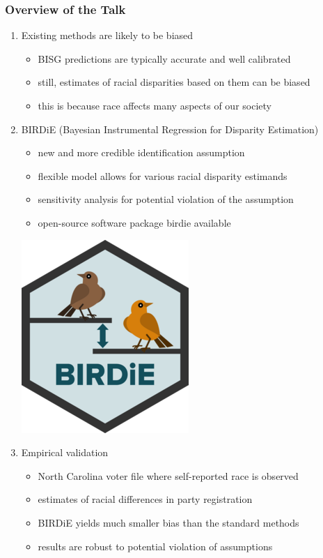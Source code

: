 \documentclass[handout]{beamer}
\begin{document}
\begin{frame}

  \frametitle{Overview of the Talk}

  \begin{enumerate}
  \item Existing methods are likely to be biased
    \begin{itemize}
    \item BISG predictions are typically accurate and well calibrated
    \item still, estimates of racial disparities based on them can be biased
    \item this is because race affects many aspects of our society
    \end{itemize}
    \bigskip
  \item \alert{BIRDiE} (Bayesian Instrumental Regression for Disparity
    Estimation) 
    \begin{itemize}
    \item new and more credible identification assumption
    \item flexible model allows for various racial disparity estimands
    \item sensitivity analysis for potential violation of the
      assumption
    \item open-source software package \alert{birdie} available
    \end{itemize}
    \begin{flushright}
      \vspace{-.5in}
      \includegraphics[scale=0.165]{../man/figures/logo.png}
     \end{flushright}
  \item Empirical validation
    \begin{itemize}
    \item North Carolina voter file where self-reported race is
      observed
    \item estimates of racial differences in party registration
    \item BIRDiE yields much smaller bias than the standard methods
    \item results are robust to potential violation of assumptions
    \end{itemize}
  \end{enumerate}

\end{frame}
\end{document}
